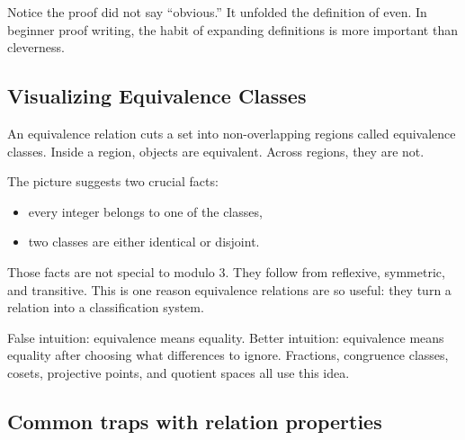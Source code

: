 Notice the proof did not say ``obvious.'' It unfolded the definition of even. In beginner proof writing, the habit of expanding definitions is more important than cleverness.

\subsection{Visualizing Equivalence Classes}

An equivalence relation cuts a set into non-overlapping regions called equivalence classes. Inside a region, objects are equivalent. Across regions, they are not.

\begin{center}
\end{center}

The picture suggests two crucial facts:

\begin{itemize}
\item every integer belongs to one of the classes,
\item two classes are either identical or disjoint.
\end{itemize}

Those facts are not special to modulo $3$. They follow from reflexive, symmetric, and transitive. This is one reason equivalence relations are so useful: they turn a relation into a classification system.

\begin{trapbox}
False intuition: equivalence means equality. Better intuition: equivalence means equality after choosing what differences to ignore. Fractions, congruence classes, cosets, projective points, and quotient spaces all use this idea.
\end{trapbox}

\subsection{Common traps with relation properties}

